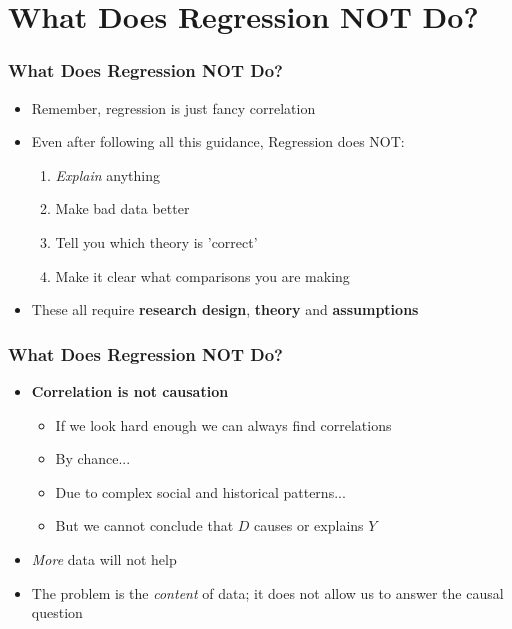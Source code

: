 \documentclass[xcolor=x11names,compress]{beamer}\usepackage[]{graphicx}\usepackage[]{color}
\newenvironment{knitrout}{}{} %
\renewcommand{\(}{\begin{columns}}
\renewcommand{\)}{\end{columns}}
\newcommand{\<}[1]{\begin{column}{#1}}
\renewcommand{\>}{\end{column}}
\begin{document}
\begin{frame}
\begin{multicols}{2}
\begin{knitrout}
\end{knitrout}
\end{multicols}
\end{frame}

\section{What Does Regression NOT Do?}

\begin{frame}
\frametitle{What Does Regression NOT Do?}
\begin{itemize}
\item Remember, regression is just fancy correlation
\pause
\item Even after following all this guidance, Regression does NOT:
\begin{enumerate}
\item \textit{Explain} anything
\item Make bad data better
\item Tell you which theory is 'correct'
\item Make it clear what comparisons you are making
\end{enumerate}
\pause
\item These all require \textbf{research design}, \textbf{theory} and \textbf{assumptions}
\end{itemize}
\end{frame}

\begin{frame}
\frametitle{What Does Regression NOT Do?}
\begin{itemize}
\item \textbf{Correlation is not causation}
\pause
\begin{itemize}
\item If we look hard enough we can always find correlations
\pause
\item By chance...
\pause
\item Due to complex social and historical patterns...
\pause
\item But we cannot conclude that $D$ causes or explains $Y$
\pause
\end{itemize}
\item \textit{More} data will not help
\pause
\item The problem is the \textit{content} of data; it does not allow us to answer the causal question 
\end{itemize}
\end{frame}
\end{document}
